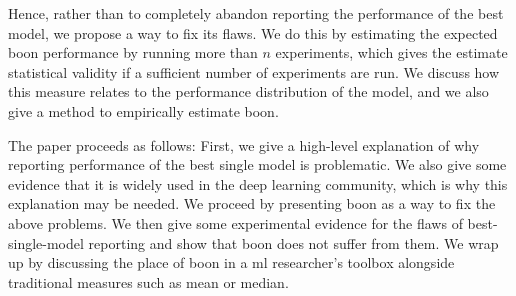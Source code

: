 \documentclass{article}
\newcommand{\ml}{\gls{ml}\xspace}
\newcommand{\tboon}{\gls{boon}\xspace}
\begin{document}
Hence, rather than to completely abandon reporting the performance of the best model, we propose a way to fix its flaws. We do this by estimating the expected \tboon performance by running more than $n$ experiments, which gives the estimate statistical validity if a sufficient number of experiments are run. We discuss how this measure relates to the performance distribution of the model, and we also give a method to empirically estimate \tboon.

The paper proceeds as follows: First, we give a high-level explanation of why reporting performance of the best single model is problematic. We also give some evidence that it is widely used in the deep learning community, which is why this explanation may be needed. We proceed by presenting \tboon as a way to fix the above problems. We then give some experimental evidence for the flaws of best-single-model reporting and show that \tboon does not suffer from them. We wrap up by discussing the place of \tboon in a \ml researcher's toolbox alongside traditional measures such as mean or median.
        



\end{document}
